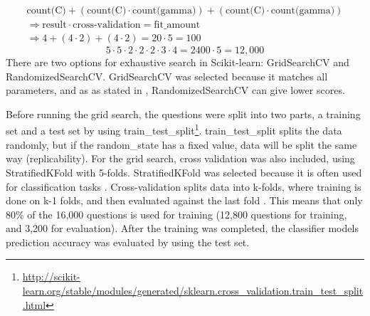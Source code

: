 \begin{equation}\label{eq:fit_svc}
\begin{split}
\text{count(C)} + (\text{count(C)} \cdot \text{count(gamma)}) + (\text{count(C)} \cdot \text{count(gamma)}) \\
\Longrightarrow  \text{result} \cdot \text{cross-validation} = \text{fit\_amount} \\
\Longrightarrow  4 + (4 \cdot 2) + (4 \cdot 2) = 20 \cdot 5 = 100 
\end{split}
\end{equation}
\begin{equation}\label{eq:fit_sgd}
 5 \cdot 5 \cdot 2 \cdot 2 \cdot 2 \cdot 3 \cdot 4 = 2400 \cdot 5 = 12,000
\end{equation}
There are two options for exhaustive search in Scikit-learn: GridSearchCV and RandomizedSearchCV.
GridSearchCV was selected because it matches all parameters, and as as stated in \cite{Markham2015a}, RandomizedSearchCV can give lower scores.
\begin{comment}
From Scikit-learn, there are two options for exhaustive search: GridSearchCV and RandomizedSearchCV.
The main difference is that GridSearchCV matches all parameters, and RandomizedSearchCV only uses a selection of the parameters. 
RandomizedSearchCV is faster than GridSearchCV, but as stated in \cite{Markham2015a}, it may give lower scores.
\textcite{Markham2015a} also suggests to start GridSearchCV and then compare the results against RandomizedSearchCV.
Since I wanted to find the best parameters from the selection, GridSearchCV was used. 
However, if the goal was to fine-tune the parameters, RandomizedSearchCV could be more fitting. 
E.g. start with a high spread of values, and after each completed training, select a new set of values based on the best results. 
If the score was then too low, or if you wanted better results, you could use GridSearchCV to find the best parameters.
\end{comment} 
\vspace{0.5em}\newline
Before running the grid search, the questions were split into two parts, a training set and a test set by using 
 train\_test\_split\footnote{\url{http://scikit-learn.org/stable/modules/generated/sklearn.cross_validation.train_test_split.html}}.
train\_test\_split splits the data randomly, but if the random\_state has a fixed value, data will be split the same way (replicability).
For the grid search, cross validation was also included, using StratifiedKFold with 5-folds.
StratifiedKFold was selected because it is often used for classification tasks \cite{Kononenko2007}.
Cross-validation splits data into k-folds, where training is done on k-1 folds, and then evaluated against the last fold \cite{Bishop2006}.
This means that only 80\% of the 16,000 questions is used for training (12,800 questions for training, and 3,200 for evaluation).
After the training was completed, the classifier models prediction accuracy was evaluated by using the test set.

